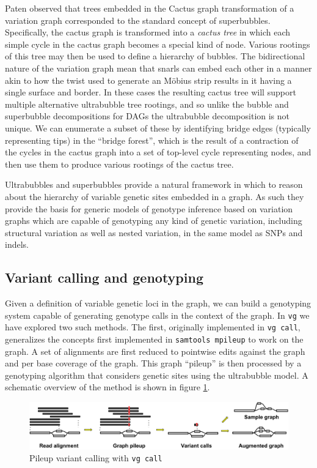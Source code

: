 Paten observed that trees embedded in the Cactus graph transformation of a variation graph corresponded to the standard concept of superbubbles.
Specifically, the cactus graph is transformed into a \emph{cactus tree} in which each simple cycle in the cactus graph becomes a special kind of node.
Various rootings of this tree may then be used to define a hierarchy of bubbles.
The bidirectional nature of the variation graph mean that snarls can embed each other in a manner akin to how the twist used to generate an M\"{o}bius strip results in it having a single surface and border.
In these cases the resulting cactus tree will support multiple alternative ultrabubble tree rootings, and so unlike the bubble and superbubble decompositions for DAGs the ultrabubble decomposition is not unique.
We can enumerate a subset of these by identifying bridge edges (typically representing tips) in the ``bridge forest'', which is the result of a contraction of the cycles in the cactus graph into a set of top-level cycle representing nodes, and then use them to produce various rootings of the cactus tree.

Ultrabubbles and superbubbles provide a natural framework in which to reason about the hierarchy of variable genetic sites embedded in a graph.
As such they provide the basis for generic models of genotype inference based on variation graphs which are capable of genotyping any kind of genetic variation, including structural variation as well as nested variation, in the same model as SNPs and indels.

\subsection{Variant calling and genotyping}

Given a definition of variable genetic loci in the graph, we can build a genotyping system capable of generating genotype calls in the context of the graph.
In {\tt vg} we have explored two such methods.
The first, originally implemented in {\tt vg call}, generalizes the concepts first implemented in {\tt samtools mpileup} to work on the graph.
A set of alignments are first reduced to pointwise edits against the graph and per base coverage of the graph.
This graph ``pileup'' is then processed by a genotyping algorithm that considers genetic sites using the ultrabubble model.
A schematic overview of the method is shown in figure \ref{fig:vg_call}.

\begin{figure}[htbp!]
  \includegraphics[width=1.0\textwidth]{Chapter2/Figs/vg_call.pdf}
  \caption{
    Pileup variant calling with {\tt vg call}
    }
  \label{fig:vg_call}
\end{figure}

